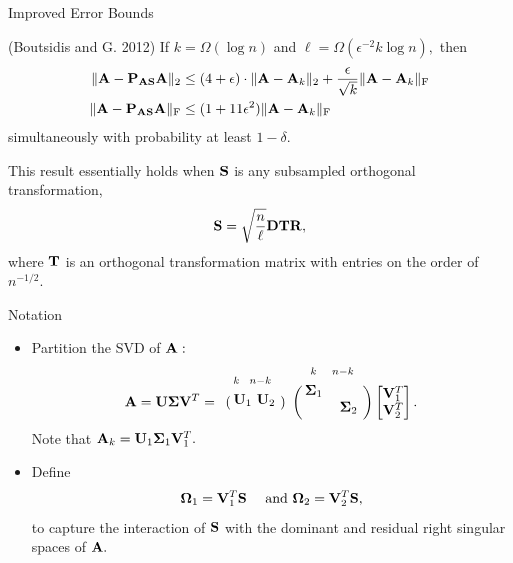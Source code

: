 \documentclass[xcolor=x11names,compress,ignorenonframetext]{beamer}
\let\bbordermatrix\bordermatrix
\renewcommand{\(}{\begin{columns}}
\renewcommand{\)}{\end{columns}}
\newcommand{\<}[1]{\begin{column}{#1}}
\renewcommand{\>}{\end{column}}
\def\refcolor{DodgerBlue4}
\newcommand{\refer}[1]{({\color{\refcolor}#1})}
\begin{document}
\begin{frame}{Improved Error Bounds}
 \begin{block}{\refer{Boutsidis and G. 2012}}
  If $k = \Omega(\log n)$ and $\ell = \Omega( \epsilon^{-2} k \log n ),$ then
  \begin{align*}
      \|\mathbf{A} - \mathbf{P}_{\mathbf{A}\mathbf{S}} \mathbf{A}\|_2 & \leq 
       (4 + \epsilon )\cdot \|\mathbf{A} - \mathbf{A}_k\|_2 + \frac{\epsilon}{\sqrt{k}} \|\mathbf{A} - \mathbf{A}_k\|_{\mathrm{F}} \\
   \|\mathbf{A} - \mathbf{P}_{\mathbf{A}\mathbf{S}} \mathbf{A}\|_{\mathrm{F}} & \leq (1 + 11\epsilon^2) \|\mathbf{A} - \mathbf{A}_k\|_{\mathrm{F}}
  \end{align*}
  simultaneously with probability at least $1 - \delta.$
 \end{block}

 This result essentially holds when $\mathbf{S}$ is any subsampled orthogonal transformation,
 \[
  \mathbf{S} = \sqrt{\frac{n}{\ell}} \mathbf{D} \mathbf{T} \mathbf{R},
 \]
 where $\mathbf{T}$ is an orthogonal transformation matrix with entries on the order of $n^{-1/2}.$
\end{frame}

\begin{frame}{Notation}
\begin{itemize}
 \item Partition the SVD of $\mathbf{A}:$
\vspace{-1em}
 \[ 
\mat{A} = \mat{U} \matSig \mat{V}\transp = \bbordermatrix{%
&^k \vspace{-0.75ex} & \!\!^{n-k}  \hspace{1ex}\cr
& \vspace{0.25ex} \mat{U}_1 \hspace{-2ex} & \mat{U}_2 
}
\bbordermatrix{%
& \vspace{-0.75ex} ^k &\!\!^{n-k} \hspace{1ex}\cr
& \matSig_1 & \cr
& \vspace{0.5ex} & \matSig_2 
}
\left[
\begin{matrix}
\mat{V}_1\transp \\
\mat{V}_2\transp  
\end{matrix}
\right].
\]
 Note that $\mathbf{A}_k = \mathbf{U}_1 \boldsymbol{\Sigma}_1 \mathbf{V}_1^T.$ 

 \item Define
\[
 \boldsymbol{\Omega}_1 = \mathbf{V}_1^T \mathbf{S} \quad \text{ and } \boldsymbol{\Omega}_2 = \mathbf{V}_2^T \mathbf{S},
\]
to capture the interaction of $\mathbf{S}$ with the dominant and residual right singular spaces of $\mathbf{A}.$
\vspace{1em}
\end{itemize}

\end{frame}
\end{document}
